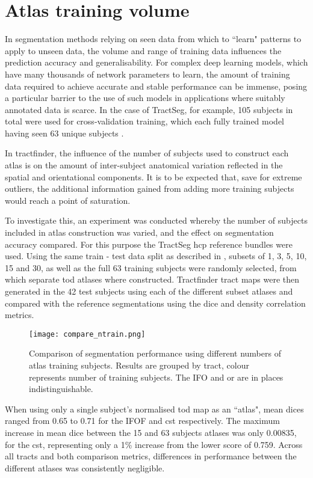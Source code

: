 \section{Atlas training volume}

In segmentation methods relying on seen data from which to ``learn" patterns to apply to unseen data, the volume and range of training data influences the prediction accuracy and generalisability. 
For complex deep learning models, which have many thousands of network parameters to learn, the amount of training data required to achieve accurate and stable performance can be immense, posing a particular barrier to the use of such models in applications where suitably annotated data is scarce.
In the case of TractSeg, for example, 105 subjects in total were used for cross-validation training, which each fully trained model having seen 63 unique subjects .

In tractfinder, the influence of the number of subjects used to construct each atlas is on the amount of inter-subject anatomical variation reflected in the spatial and orientational components.
It is to be expected that, save for extreme outliers, the additional information gained from adding more training subjects would reach a point of saturation.

To investigate this, an experiment was conducted whereby the number of subjects included in atlas construction was varied, and the effect on segmentation accuracy compared.
For this purpose the TractSeg \gls{hcp} reference bundles were used.
Using the same train - test data split as described in , subsets of 1, 3, 5, 10, 15 and 30, as well as the full 63 training subjects were randomly selected, from which separate \gls{tod} atlases where constructed.
Tractfinder tract maps were then generated in the 42 test subjects using each of the different subset atlases and compared with the reference segmentations using the \gls{dice} and density correlation metrics.

\begin{figure}
    \texttt{[image: compare\_ntrain.png]}
    \caption{Comparison of segmentation performance using different numbers of atlas training subjects. Results are grouped by tract, colour represents number of training subjects. The IFO and \gls{or} are in places indistinguishable. }
    \label{fig:ntrain}
\end{figure}

When using only a single subject's normalised \gls{tod} map as an ``atlas", mean \gls{dice}s ranged from 0.65 to 0.71 for the IFOF and \gls{cst} respectively.
The maximum increase in mean \gls{dice} between the 15 and 63 subjects atlases was only 0.00835, for the \gls{cst}, representing only a 1\% increase from the lower score of 0.759.
Across all tracts and both comparison metrics, differences in performance between the different atlases was consistently negligible.

